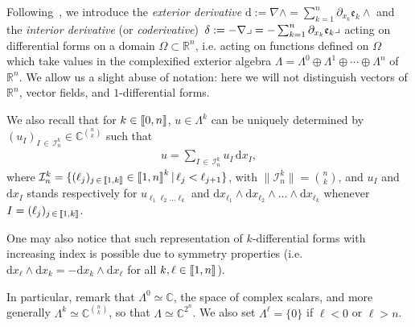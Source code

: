 \documentclass[10pt]{amsart}
\theoremstyle{definition}\newtheorem{defi}[theo]{Definition}\newtheorem{rema}[theo]{Remark}\newtheorem{exam}[theo]{Example}\newtheorem{exem}[theo]{Example}\newtheorem{nota}[theo]{Notation}
\newcommand{\bbR}{\mathbb{R}}
\newcommand{\bbC}{\mathbb{C}}
\newcommand{\rmd}{\mathrm{d}}
\newcommand{\clI}{\mathcal{I}}
\newcommand{\fke}{\mathfrak{e}}
\newcommand{\llbracket}{\mathopen{[\mkern -2.7mu[}}
\newcommand{\rrbracket}{\mathclose{]\mkern -2.7mu]}}
\newcommand{\llb}{\llbracket}
\newcommand{\rrb}{\rrbracket}
\begin{document}
Following~\cite{McintoshMonniaux2018,Monniaux2021}, we introduce the \emph{exterior derivative} $\rmd:=\nabla \wedge=\sum_{k=1}^{n} \partial_{x_k} \fke _{k} \wedge$ and the \emph{interior derivative} (or \emph{coderivative}) $\left.{\delta}:=-\nabla\lrcorner=-\sum_{k=1}^{n} \partial_{x_k} \fke _{k}\right\lrcorner$ acting on differential forms on a domain $\Omega \subset \bbR^{n}$, i.e. acting on functions defined on $\Omega$ which take values in the complexified exterior algebra $\Lambda=\Lambda^{0} \oplus \Lambda^{1} \oplus \cdots \oplus \Lambda^{n}$ of $\bbR^{n}$. We allow us a slight abuse of notation: here we will not distinguish vectors of $\bbR^n$, vector fields, and $1$-differential forms.

We also recall that for $k\in \llb 0,n\rrb$, $u \in \Lambda^k$ can be uniquely determined by $(u_{I})_{I\,\in\,\clI^k_n}\in\bbC^{\binom{n}{k}}$ such that
\begin{align*}
u = \sum_{I\,\in\,\clI^k_n} u_{I} \,\rmd x_{I},
\end{align*}
where $\clI^k_n=\{(\ell_j)_{j\,\in\,\llb 1,k\rrb}\in\llb 1,n\rrb^k\,|\, \ell_j< \ell_{j+1}\}$, with $\|\clI^k_n\| = {\binom{n}{k}}$, and $u_{I}$ and $\rmd x_{I}$ stands respectively for $u_{\ell_1 \ell_2\ldots \ell_k}$ and $\rmd x_{\ell_1}\wedge\rmd x_{\ell_2}\wedge\ldots\wedge\rmd x_{\ell_k}$ whenever $I=(\ell_j)_{j\,\in\,\llb 1,k\rrb}$.

One may also notice that such representation of $k$-differential forms with increasing index is possible due to symmetry properties (i.e. $\rmd x_{\ell}\wedge\rmd x_{k} = - \rmd x_{k}\wedge\rmd x_{\ell}$ for all $k,\ell\in\llb 1,n\rrb$).

In particular, remark that $\Lambda^{0}\simeq \bbC$, the space of complex scalars, and more generally $\Lambda^k\simeq \bbC^{{\binom{n}{k}}}$, so that $\Lambda \simeq \bbC^{2^n}$. We also set $\Lambda^{\ell}=\{0\}$ if $\ell<0$ or $\ell>n$.
\end{document}

